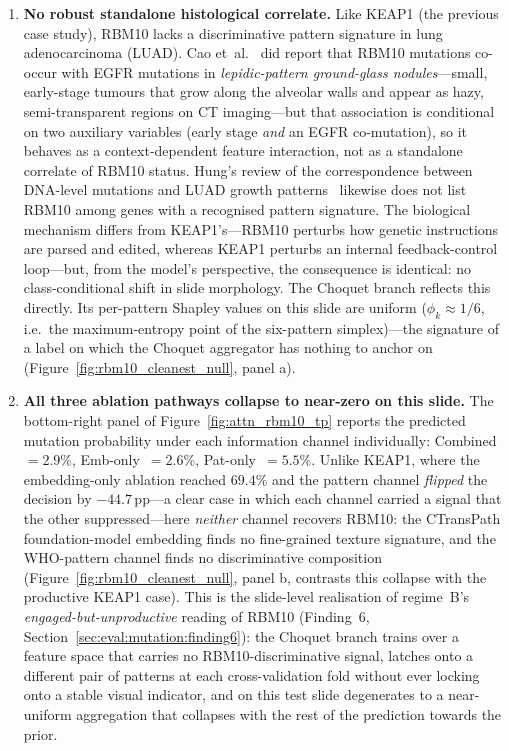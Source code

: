 \begin{enumerate}
    \item \textbf{No robust standalone histological correlate.}
    Like KEAP1 (the previous case study), RBM10 lacks a
    discriminative pattern signature in lung adenocarcinoma
    (LUAD).
    Cao et~al.~\cite{cao2024rbm10egfr} did report that RBM10
    mutations co-occur with EGFR mutations in
    \emph{lepidic-pattern ground-glass nodules}---small,
    early-stage tumours that grow along the alveolar walls
    and appear as hazy, semi-transparent regions on CT
    imaging---but that association is conditional on two
    auxiliary variables (early stage \emph{and} an EGFR
    co-mutation), so it behaves as a context-dependent
    feature interaction, not as a standalone correlate of
    RBM10 status.
    Hung's review of the correspondence between DNA-level
    mutations and LUAD growth patterns~\cite{hung2020molecular}
    likewise does not list RBM10 among genes with a recognised
    pattern signature.
    The biological mechanism differs from KEAP1's---RBM10
    perturbs how genetic instructions are parsed and edited,
    whereas KEAP1 perturbs an internal feedback-control
    loop---but, from the model's perspective, the consequence
    is identical: no class-conditional shift in slide
    morphology.
    The Choquet branch reflects this directly.
    Its per-pattern Shapley values on this slide are uniform
    ($\phi_k \approx 1/6$, i.e.\ the maximum-entropy point of
    the six-pattern simplex)---the signature of a label on
    which the Choquet aggregator has nothing to anchor on
    (Figure~\ref{fig:rbm10_cleanest_null}, panel a).

    \item \textbf{All three ablation pathways collapse to
    near-zero on this slide.}
    The bottom-right panel of
    Figure~\ref{fig:attn_rbm10_tp} reports the predicted
    mutation probability under each information channel
    individually:
    Combined~$= 2.9\%$, Emb-only~$= 2.6\%$,
    Pat-only~$= 5.5\%$.
    Unlike KEAP1, where the embedding-only ablation reached
    $69.4\%$ and the pattern channel \emph{flipped} the
    decision by $-44.7$\,pp---a clear case in which each
    channel carried a signal that the other suppressed---here
    \emph{neither} channel recovers RBM10: the CTransPath
    foundation-model embedding finds no fine-grained texture
    signature, and the WHO-pattern channel finds no
    discriminative composition
    (Figure~\ref{fig:rbm10_cleanest_null}, panel b, contrasts
    this collapse with the productive KEAP1 case).
    This is the slide-level realisation of regime~B's
    \emph{engaged-but-unproductive} reading of RBM10
    (Finding~6, Section~\ref{sec:eval:mutation:finding6}):
    the Choquet branch trains over a feature space that carries
    no RBM10-discriminative signal, latches onto a different
    pair of patterns at each cross-validation fold without
    ever locking onto a stable visual indicator, and on this
    test slide degenerates to a near-uniform aggregation that
    collapses with the rest of the prediction towards the prior.


\end{enumerate}
